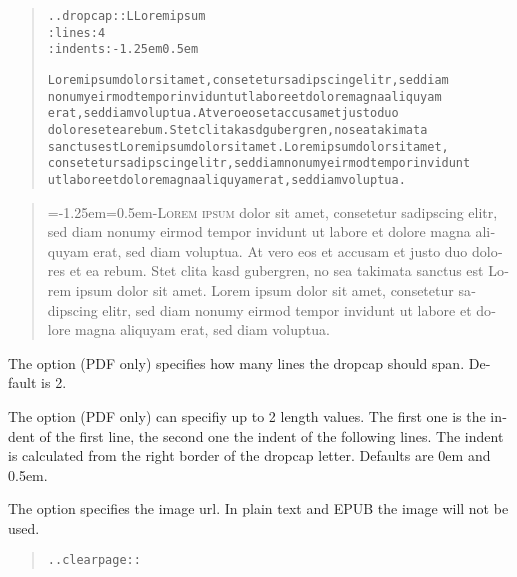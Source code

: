 \documentclass[a5paper]{book}
\begin{document}
\begin{german}
\begin{quote}
\begin{alltt}
.. dropcap:: L Lorem ipsum
   :lines: 4
   :indents: -1.25em 0.5em

Lorem ipsum dolor sit amet, consetetur sadipscing elitr, sed diam
nonumy eirmod tempor invidunt ut labore et dolore magna aliquyam
erat, sed diam voluptua. At vero eos et accusam et justo duo
dolores et ea rebum. Stet clita kasd gubergren, no sea takimata
sanctus est Lorem ipsum dolor sit amet. Lorem ipsum dolor sit amet,
consetetur sadipscing elitr, sed diam nonumy eirmod tempor invidunt
ut labore et dolore magna aliquyam erat, sed diam voluptua.
\end{alltt}
\end{quote}

\begin{quotation}\noindent
\begin{container}
\clearpage

=-1.25em=0.5em\advance{}-\clubpenalty\@M\lettrine[lines=4,findent=\dimen0,nindent=\dimen1]{L}{\scshape{orem ipsum}} dolor sit amet, consetetur sadipscing elitr, sed diam
nonumy eirmod tempor invidunt ut labore et dolore magna aliquyam
erat, sed diam voluptua. At vero eos et accusam et justo duo
dolores et ea rebum. Stet clita kasd gubergren, no sea takimata
sanctus est Lorem ipsum dolor sit amet. Lorem ipsum dolor sit amet,
consetetur sadipscing elitr, sed diam nonumy eirmod tempor invidunt
ut labore et dolore magna aliquyam erat, sed diam voluptua.\par
\end{container}
\end{quotation}

{\noindent}The {} option (PDF only) specifies how many lines the
dropcap should span. Default is 2.\par

The {} option (PDF only) can specifiy up to 2 length
values. The first one is the indent of the first line, the second one
the indent of the following lines. The indent is calculated from the
right border of the dropcap letter. Defaults are 0em and 0.5em.\par

The {} option specifies the image url. In plain text and
EPUB the image will not be used.\par

\begin{quote}
\begin{alltt}
.. clearpage::


\end{alltt}
\end{quote}
\end{german}
\end{document}
